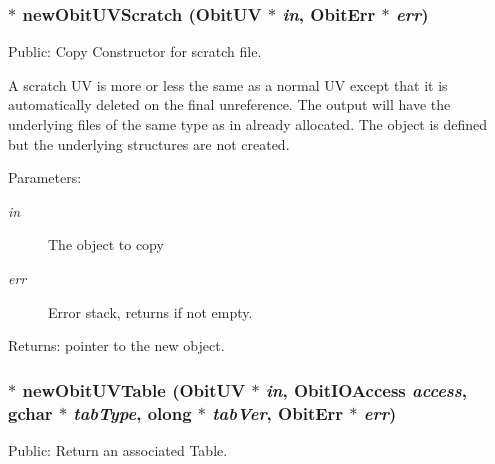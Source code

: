 \subsubsection{$\ast$ new\-Obit\-UVScratch ({\bf Obit\-UV} $\ast$ {\em in}, {\bf Obit\-Err} $\ast$ {\em err})}\label{ObitUV_8c_a12}


Public: Copy Constructor for scratch file. 

A scratch UV is more or less the same as a normal UV except that it is automatically deleted on the final unreference. The output will have the underlying files of the same type as in already allocated. The object is defined but the underlying structures are not created. \begin{Desc}
\item[Parameters:]
\begin{description}
\item[{\em in}]The object to copy \item[{\em err}]Error stack, returns if not empty. \end{description}
\end{Desc}
\begin{Desc}
\item[Returns:]pointer to the new object. \end{Desc}
\subsubsection{$\ast$ new\-Obit\-UVTable ({\bf Obit\-UV} $\ast$ {\em in}, Obit\-IOAccess {\em access}, gchar $\ast$ {\em tab\-Type}, {\bf olong} $\ast$ {\em tab\-Ver}, {\bf Obit\-Err} $\ast$ {\em err})}\label{ObitUV_8c_a30}


Public: Return an associated Table. 

